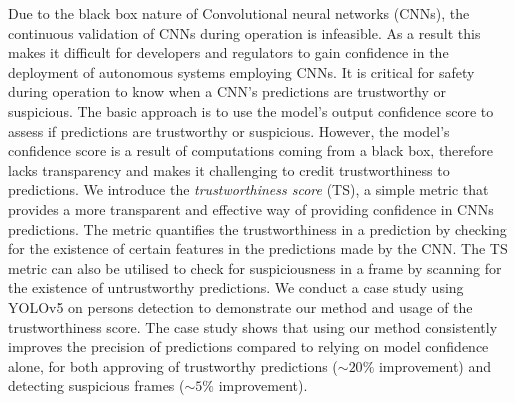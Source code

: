 Due to the black box nature of Convolutional neural networks (CNNs), the continuous validation of CNNs during operation is infeasible. 
%
As a result this makes it difficult for developers and regulators to gain confidence in the deployment of autonomous systems employing CNNs.
%
It is critical for safety during operation to know when a CNN's predictions are trustworthy or suspicious.  
%
The basic approach is to use the model's output confidence score to assess if predictions are trustworthy or suspicious. 
%
However, the model's confidence score is a result of computations coming from a black box, therefore lacks transparency and makes it challenging to credit trustworthiness to predictions.
%
We introduce the \textit{trustworthiness score} (TS), a simple metric that provides a more transparent and effective way of providing confidence in CNNs predictions. 
%
The metric quantifies the trustworthiness in a prediction by checking for the existence of certain features in the predictions made by the CNN. 
%
The TS metric can also be utilised to check for suspiciousness in a frame by scanning for the existence of  untrustworthy predictions.%
%
We conduct a case study using YOLOv5 on persons detection to demonstrate our method and usage of the trustworthiness score. 
%
The case study shows that using our method consistently improves the precision of predictions compared to relying on model confidence alone, for both approving of trustworthy predictions ($\sim 20\%$ improvement) and detecting suspicious frames ($\sim 5\%$ improvement). 